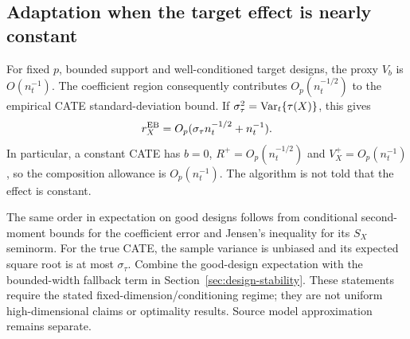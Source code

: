 \subsection{Adaptation when the target effect is nearly constant}

For fixed $p$, bounded support and well-conditioned target designs, the proxy
$V_b$ is $O(n_t^{-1})$. The coefficient region consequently contributes
$O_p(n_t^{-1/2})$ to the empirical CATE standard-deviation bound. If
$\sigma_\tau^2=\operatorname{Var}_t\{\tau(X)\}$, this gives
\[
 r_X^{\rm EB}=O_p(\sigma_\tau n_t^{-1/2}+n_t^{-1}).
\]
In particular, a constant CATE has $b=0$, $R^+=O_p(n_t^{-1/2})$ and
$V_X^+=O_p(n_t^{-1})$, so the composition allowance is $O_p(n_t^{-1})$.
The algorithm is not told that the effect is constant.

The same order in expectation on good designs follows from conditional
second-moment bounds for the coefficient error and Jensen's inequality for
its $S_X$ seminorm. For the true CATE, the sample variance is unbiased and its
expected square root is at most $\sigma_\tau$. Combine the good-design
expectation with the bounded-width fallback term in
Section~\ref{sec:design-stability}. These statements require the stated
fixed-dimension/conditioning regime; they are not uniform high-dimensional
claims or optimality results. Source model approximation remains separate.
